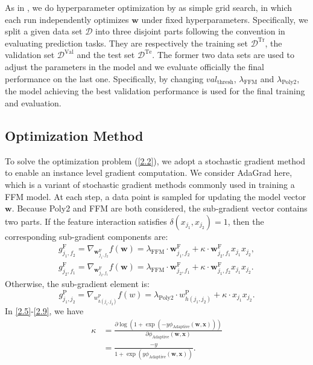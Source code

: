 As in \cite{Beutel:2017:BGO:3038912.3052713}, we do hyperparameter optimization by as simple grid search, in which each run independently optimizes $\boldsymbol{w}$ under fixed hyperparameters. Specifically, we split a given data set $\mathcal{D}$ into three disjoint parts following the convention in evaluating prediction tasks. They are respectively the training set $\mathcal{D}^\text{Tr}$, the validation set $\mathcal{D}^\text{Val}$ and the test set $\mathcal{D}^\text{Te}$. The former two data sets are used to adjust the parameters in the model and we evaluate officially the final performance on the last one. Specifically, by changing $val_{\text{thresh}}$, $\lambda_\text{FFM}$ and $\lambda_\text{Poly2}$, the model achieving the best validation performance is used for the final training and evaluation.

\subsection{Optimization Method}

To solve the optimization problem (\ref{2.2}), we adopt a stochastic gradient method to enable an instance level gradient computation. We consider AdaGrad \cite{duchi2011adaptive} here, which is a variant of stochastic gradient methods commonly used in training a FFM model. At each step, a data point is sampled for updating the model vector $\boldsymbol{w}$. Because Poly2 and FFM are both considered, the sub-gradient vector contains two parts. If the feature interaction satisfies $\delta(x_{j_1},x_{j_2}) = 1$, then the corresponding sub-gradient components are:
\begin{align}
\label{2.5}
\boldsymbol{\mathit{g}}_{j_1,f_2}^\text{F} = \nabla_{\boldsymbol{w}_{j_1,f_2}^\text{F}}f(\boldsymbol{w}) = \lambda_\text{FFM}\cdot\boldsymbol{w}_{j_1,f_2}^\text{F} + \kappa\cdot\boldsymbol{w}_{j_2,f_1}^\text{F}x_{j_1}x_{j_2}, \\
\boldsymbol{\mathit{g}}_{j_2,f_1}^\text{F} = \nabla_{\boldsymbol{w}_{j_2,f_1}^\text{F}}f(\boldsymbol{w}) = \lambda_\text{FFM}\cdot\boldsymbol{w}_{j_2,f_1}^\text{F} + \kappa\cdot\boldsymbol{w}_{j_1,f_2}^\text{F}x_{j_1}x_{j_2}. \label{2.6}
\end{align}
Otherwise, the sub-gradient element is:
\begin{equation}
\label{2.9}
\mathit{g}_{j_1,j_2}^\text{P} = \nabla_{w_{h(j_1,j_2)}^\text{P}}f(w) = \lambda_\text{Poly2}\cdot w_{h(j_1,j_2)}^\text{P} + \kappa\cdot x_{j_1}x_{j_2}.
\end{equation}
In \eqref{2.5}-\eqref{2.9}, we have
\begin{equation}
\label{2.3.0}
\begin{aligned}
\kappa &= \frac{\partial\log(1+\exp(-y\phi_{\text{Adaptive}}(\boldsymbol{w},\boldsymbol{x})))}{\partial\phi_{\text{Adaptive}}(\boldsymbol{w},\boldsymbol{x})} \\
&= \frac{-y}{1+\exp(y\phi_{\text{Adaptive}}(\boldsymbol{w},\boldsymbol{x}))}.
\end{aligned}
\end{equation}

